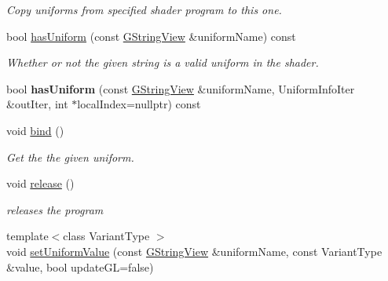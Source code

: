 \begin{Indent}
\begin{DoxyCompactItemize}
\begin{DoxyCompactList}\small\item\em Copy uniforms from specified shader program to this one. \end{DoxyCompactList}\item 
\mbox{\label{classrev_1_1_shader_program_a61c730fa4c430837d01f097520fa367e}} 
bool \mbox{\hyperlink{classrev_1_1_shader_program_a61c730fa4c430837d01f097520fa367e}{has\+Uniform}} (const \mbox{\hyperlink{classrev_1_1_g_string_view}{G\+String\+View}} \&uniform\+Name) const
\begin{DoxyCompactList}\small\item\em Whether or not the given string is a valid uniform in the shader. \end{DoxyCompactList}\item 
\mbox{\label{classrev_1_1_shader_program_a25b5e8b84b1ec86ca019c365a896ccd5}} 
bool {\bfseries has\+Uniform} (const \mbox{\hyperlink{classrev_1_1_g_string_view}{G\+String\+View}} \&uniform\+Name, Uniform\+Info\+Iter \&out\+Iter, int $\ast$local\+Index=nullptr) const
\item 
void \mbox{\hyperlink{classrev_1_1_shader_program_adbb68e6df7d72ffd81faac60f8f4ff05}{bind}} ()
\begin{DoxyCompactList}\small\item\em Get the the given uniform. \end{DoxyCompactList}\item 
\mbox{\label{classrev_1_1_shader_program_a1d8673e0b5df6522c6c18e66d915e215}} 
void \mbox{\hyperlink{classrev_1_1_shader_program_a1d8673e0b5df6522c6c18e66d915e215}{release}} ()
\begin{DoxyCompactList}\small\item\em releases the program \end{DoxyCompactList}\item 
\mbox{\label{classrev_1_1_shader_program_aac93904eac71eac6d9d22493c8ace569}} 
{\footnotesize template$<$class Variant\+Type $>$ }\\void \mbox{\hyperlink{classrev_1_1_shader_program_aac93904eac71eac6d9d22493c8ace569}{set\+Uniform\+Value}} (const \mbox{\hyperlink{classrev_1_1_g_string_view}{G\+String\+View}} \&uniform\+Name, const Variant\+Type \&value, bool update\+GL=false)

\end{DoxyCompactItemize}
\end{Indent}
